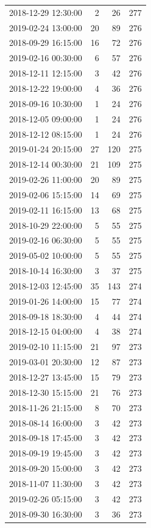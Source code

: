 \begin{tabular}{lrrr}
2018-12-29 12:30:00 & 2 & 26 & 277 \\
2019-02-24 13:00:00 & 20 & 89 & 276 \\
2018-09-29 16:15:00 & 16 & 72 & 276 \\
2019-02-16 00:30:00 & 6 & 57 & 276 \\
2018-12-11 12:15:00 & 3 & 42 & 276 \\
2018-12-22 19:00:00 & 4 & 36 & 276 \\
2018-09-16 10:30:00 & 1 & 24 & 276 \\
2018-12-05 09:00:00 & 1 & 24 & 276 \\
2018-12-12 08:15:00 & 1 & 24 & 276 \\
2019-01-24 20:15:00 & 27 & 120 & 275 \\
2018-12-14 00:30:00 & 21 & 109 & 275 \\
2019-02-26 11:00:00 & 20 & 89 & 275 \\
2019-02-06 15:15:00 & 14 & 69 & 275 \\
2019-02-11 16:15:00 & 13 & 68 & 275 \\
2018-10-29 22:00:00 & 5 & 55 & 275 \\
2019-02-16 06:30:00 & 5 & 55 & 275 \\
2019-05-02 10:00:00 & 5 & 55 & 275 \\
2018-10-14 16:30:00 & 3 & 37 & 275 \\
2018-12-03 12:45:00 & 35 & 143 & 274 \\
2019-01-26 14:00:00 & 15 & 77 & 274 \\
2018-09-18 18:30:00 & 4 & 44 & 274 \\
2018-12-15 04:00:00 & 4 & 38 & 274 \\
2019-02-10 11:15:00 & 21 & 97 & 273 \\
2019-03-01 20:30:00 & 12 & 87 & 273 \\
2018-12-27 13:45:00 & 15 & 79 & 273 \\
2018-12-30 15:15:00 & 21 & 76 & 273 \\
2018-11-26 21:15:00 & 8 & 70 & 273 \\
2018-08-14 16:00:00 & 3 & 42 & 273 \\
2018-09-18 17:45:00 & 3 & 42 & 273 \\
2018-09-19 19:45:00 & 3 & 42 & 273 \\
2018-09-20 15:00:00 & 3 & 42 & 273 \\
2018-11-07 11:30:00 & 3 & 42 & 273 \\
2019-02-26 05:15:00 & 3 & 42 & 273 \\
2018-09-30 16:30:00 & 3 & 36 & 273 \\

\end{tabular}
